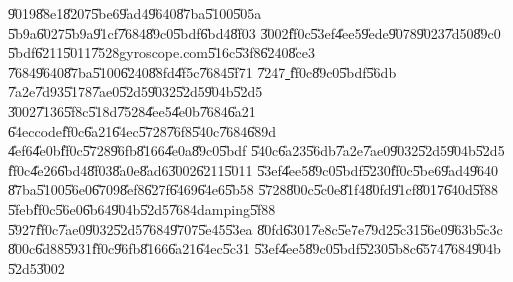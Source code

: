 \begin{case}
\U{9019}\U{88e1}\U{8207}\U{5be6}\U{9ad4}\U{9640}\U{87ba}\U{5100}\U{505a}%
\U{5b9a}\U{6027}\U{5b9a}\U{91cf}\U{7684}\U{89c0}\U{5bdf}\U{6bd4}\U{8f03}%
\U{3002}\U{ff0c}\U{53ef}\U{4ee5}\U{9ede}\U{9078}\U{9023}\U{7d50}\U{89c0}%
\U{5bdf}\U{6211}\U{5011}\U{7528}gyroscope.com\U{516c}\U{53f8}\U{6240}\U{8ce3}%
\U{7684}\U{9640}\U{87ba}\U{5100}\U{6240}\U{88fd}\U{4f5c}\U{7684}\U{5f71}%
\U{7247}\href{http://tinypic.com/r/2clcee/8}{\underline{\color{blue}%
}}\U{ff0c}\U{89c0}\U{5bdf}\U{56db}%
\U{7a2e}\U{7d93}\U{5178}\U{7ae0}\U{52d5}\U{9032}\U{52d5}\U{904b}\U{52d5}%
\U{3002}\U{7136}\U{5f8c}\U{518d}\U{7528}\U{4ee5}\U{4e0b}\U{7684}\U{6a21}%
\U{64ec}code\U{ff0c}\U{6a21}\U{64ec}\U{5728}\U{76f8}\U{540c}\U{7684}\U{689d}%
\U{4ef6}\U{4e0b}\U{ff0c}\U{5728}\U{96fb}\U{8166}\U{4e0a}\U{89c0}\U{5bdf}%
\U{540c}\U{6a23}\U{56db}\U{7a2e}\U{7ae0}\U{9032}\U{52d5}\U{904b}\U{52d5}%
\U{ff0c}\U{4e26}\U{6bd4}\U{8f03}\U{8a0e}\U{8ad6}\U{3002}\U{6211}\U{5011}%
\U{53ef}\U{4ee5}\U{89c0}\U{5bdf}\U{5230}\U{ff0c}\U{5be6}\U{9ad4}\U{9640}%
\U{87ba}\U{5100}\U{56e0}\U{6709}\U{8ef8}\U{627f}\U{6469}\U{64e6}\U{5b58}%
\U{5728}\U{800c}\U{5c0e}\U{81f4}\U{80fd}\U{91cf}\U{8017}\U{640d}\U{5f88}%
\U{5feb}\U{ff0c}\U{56e0}\U{6b64}\U{904b}\U{52d5}\U{7684}damping\U{5f88}%
\U{5927}\U{ff0c}\U{7ae0}\U{9032}\U{52d5}\U{7684}\U{9707}\U{5e45}\U{53ea}%
\U{80fd}\U{6301}\U{7e8c}\U{5e7e}\U{79d2}\U{5c31}\U{56e0}\U{963b}\U{5c3c}%
\U{800c}\U{6d88}\U{5931}\U{ff0c}\U{96fb}\U{8166}\U{6a21}\U{64ec}\U{5c31}%
\U{53ef}\U{4ee5}\U{89c0}\U{5bdf}\U{5230}\U{5b8c}\U{6574}\U{7684}\U{904b}%
\U{52d5}\U{3002}
\end{case}

%

